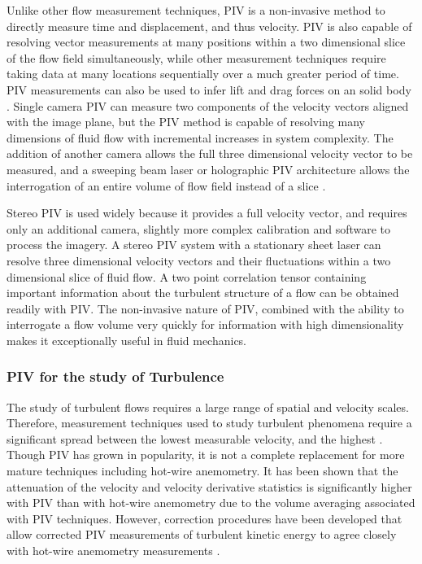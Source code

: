 Unlike other flow measurement techniques, PIV is a non-invasive method to 
directly measure time and displacement, and thus velocity. PIV is also capable 
of resolving vector measurements at many positions within a two dimensional 
slice of the flow field simultaneously, while other measurement techniques 
require taking data at many locations sequentially over a much greater period 
of time. PIV measurements can also be used to infer lift and drag forces on an 
solid body \cite{noca1997}. Single camera PIV can measure two components of the 
velocity vectors aligned with the image plane, but the PIV method is capable of 
resolving many dimensions of fluid flow with incremental increases in system 
complexity. The addition of another camera allows the full three dimensional 
velocity vector to be measured, and a sweeping beam laser or holographic PIV 
architecture allows the interrogation of an entire volume of flow field instead 
of a slice \cite{barnhart1994,elsinga2006,kahler2000}.

Stereo PIV is used widely because it provides a full velocity vector, and 
requires only an additional camera, slightly more complex calibration and 
software to process the imagery. A stereo PIV system with a 
stationary sheet laser can resolve three dimensional velocity vectors and their 
fluctuations within a two dimensional slice of fluid flow. A two point 
correlation tensor containing important information about the turbulent 
structure of a flow can be obtained readily with PIV. The non-invasive nature 
of PIV, combined with the  ability to interrogate a flow volume very quickly 
for information with high dimensionality makes it exceptionally useful in fluid 
mechanics. \cite{adrian1991}

\subsubsection{PIV for the study of Turbulence}
The study of turbulent flows requires a large range of spatial and velocity 
scales. Therefore, measurement techniques used to study turbulent phenomena 
require a significant spread between the lowest measurable velocity, and the 
highest \cite{barnhart1994}. Though PIV has grown in popularity, it is not a 
complete replacement for more mature techniques including hot-wire anemometry. 
It has been shown that the attenuation of the velocity and velocity derivative 
statistics is significantly higher with PIV than with hot-wire anemometry due 
to the volume averaging associated with PIV techniques. 
However, correction procedures have been developed that allow corrected PIV 
measurements of turbulent kinetic energy to agree closely with hot-wire 
anemometry measurements \cite{lavoie2007,kasagi1991}. 

